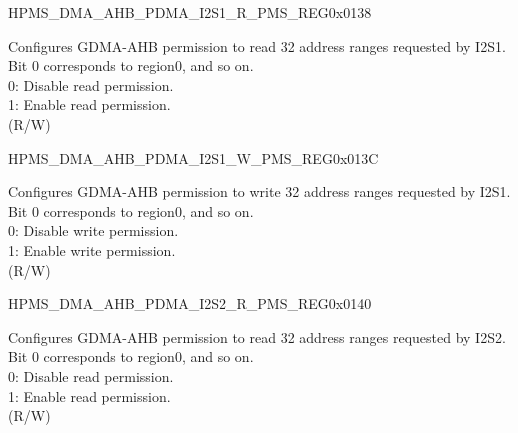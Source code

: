 \begin{register}{H}{PMS\_DMA\_AHB\_PDMA\_I2S1\_R\_PMS\_REG}{0x0138}\label{regdesc:PMSDMAAHBPDMAI2S1RPMSREG}
%
\regnewline%
\begin{regdesc}\begin{reglist}
\label{fielddesc:PMSDMAAHBPDMAI2S1RPMS}\item [PMS\_DMA\_AHB\_PDMA\_I2S1\_R\_PMS] Configures GDMA-AHB permission to read 32 address ranges requested by I2S1. Bit 0 corresponds to region0, and so on.\\
0: Disable read permission.\\
1: Enable read permission.\\ (R/W)
\end{reglist}\end{regdesc}
\end{register}


\begin{register}{H}{PMS\_DMA\_AHB\_PDMA\_I2S1\_W\_PMS\_REG}{0x013C}\label{regdesc:PMSDMAAHBPDMAI2S1WPMSREG}
%
\regnewline%
\begin{regdesc}\begin{reglist}
\label{fielddesc:PMSDMAAHBPDMAI2S1WPMS}\item [PMS\_DMA\_AHB\_PDMA\_I2S1\_W\_PMS] Configures GDMA-AHB permission to write 32 address ranges requested by I2S1. Bit 0 corresponds to region0, and so on.\\
0: Disable write permission.\\
1: Enable write permission.\\ (R/W)
\end{reglist}\end{regdesc}
\end{register}


\begin{register}{H}{PMS\_DMA\_AHB\_PDMA\_I2S2\_R\_PMS\_REG}{0x0140}\label{regdesc:PMSDMAAHBPDMAI2S2RPMSREG}
%
\regnewline%
\begin{regdesc}\begin{reglist}
\label{fielddesc:PMSDMAAHBPDMAI2S2RPMS}\item [PMS\_DMA\_AHB\_PDMA\_I2S2\_R\_PMS] Configures GDMA-AHB permission to read 32 address ranges requested by I2S2. Bit 0 corresponds to region0, and so on.\\
0: Disable read permission.\\
1: Enable read permission.\\ (R/W)
\end{reglist}\end{regdesc}
\end{register}


